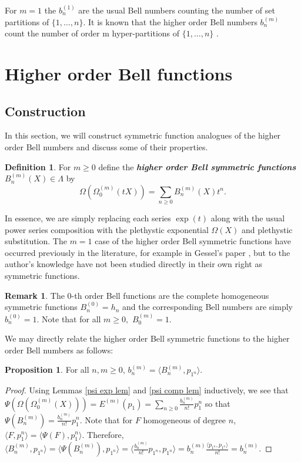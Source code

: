 \documentclass[12pt,reqno]{amsart}
\theoremstyle{definition}
\newtheorem{prop}[thm]{Proposition}
\newtheorem{defn}[thm]{Definition}
\newtheorem{remark}{Remark}
\begin{document}
For $m =1$ the $b_n^{(1)}$ are the usual Bell numbers counting the number of set partitions of $\{1,\ldots,n\}.$ It is known that the higher order Bell numbers $b_n^{(m)}$ count the number of order m hyper-partitions of $\{1,\ldots,n\}$ \cite{SK19}.


\section{Higher order Bell functions}
\subsection{Construction}

In this section, we will construct symmetric function analogues of the higher order Bell numbers and discuss some of their properties.

\begin{defn}
For $m \geq 0$ define the \textit{\textbf{higher order Bell symmetric functions}} $B_n^{(m)}(X) \in \Lambda$ by 
    $$\Omega\left( \Omega_0^{(m)}(tX) \right) = \sum_{n \geq 0} B_n^{(m)}(X)t^n.$$
\end{defn}

In essence, we are simply replacing each series $\exp(t)$ along with the usual power series composition with the plethystic exponential $\Omega(X)$ and plethystic substitution. The $m =1$ case of the higher order Bell symmetric functions have occurred previously in the literature, for example in Gessel's paper \cite{Gessel}, but to the author's knowledge have not been studied directly in their own right as symmetric functions.

\begin{remark}
    The $0$-th order Bell functions are the complete homogeneous symmetric functions $B^{(0)}_n = h_n$ and the corresponding Bell numbers are simply $b_n^{(0)} = 1.$ Note that for all $m \geq 0,$ $B_0^{(m)} = 1.$
\end{remark}

We may directly relate the higher order Bell symmetric functions to the higher order Bell numbers as follows: 

\begin{prop}\label{Bell numbers from sym functions}
For all $n,m \geq 0$,
    $b_n^{(m)} = \langle B_n^{(m)},p_{1^n} \rangle.$
\end{prop}
\begin{proof}
    Using Lemmas \ref{psi exp lem} and \ref{psi comp lem} inductively, we see that 
    $\Psi\left(\Omega \left( \Omega_0^{(m)}(X) \right) \right) = E^{(m)}(p_1) = \sum_{n \geq 0} \frac{b_n^{(m)}}{n!} p_1^n$ so that 
    $\Psi(B_n^{(m)}) = \frac{b_n^{(m)}}{n!} p_1^n.$ Note that for $F$ homogeneous of degree $n$, $\langle F, p_1^n \rangle = \langle \Psi(F), p_1^n \rangle.$ Therefore, 
    $\langle B_n^{(m)},p_{1^n} \rangle = \langle \Psi(B_n^{(m)}),p_{1^n} \rangle =\langle \frac{b_n^{(m)}}{n!} p_{1^n},p_{1^n} \rangle = b_n^{(m)} \frac{\langle p_{1^n},p_{1^n} \rangle }{n!} = b_n^{(m)}.$
\end{proof}
\end{document}
